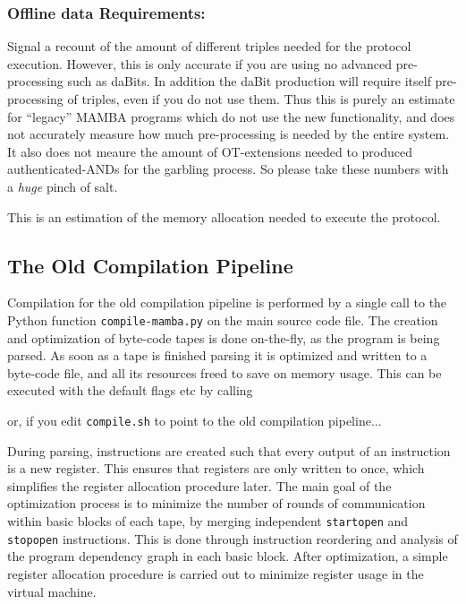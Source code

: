 \subsubsection{Offline data Requirements:}

Signal a recount of the amount of different triples needed for the protocol execution.
However, this is only accurate if you are using no advanced pre-processing such
as daBits. In addition the daBit production will require itself
pre-processing of triples, even if you do not use them. Thus this is purely an estimate
for ``legacy'' MAMBA programs which do not use the new functionality, and
does not accurately measure how much pre-processing is needed by the
entire system.
It also does not meaure the amount of OT-extensions needed to produced
authenticated-ANDs for the garbling process.
So please take these numbers with a {\em huge} pinch of salt.

This is an estimation of the memory allocation needed to execute the protocol.

\subsection{The Old Compilation Pipeline}
Compilation for the old compilation pipeline is performed by a single call to the
Python function \verb|compile-mamba.py| on the main source code file. The creation and optimization
of byte-code tapes is done on-the-fly, as the program is being parsed. As soon
as a tape is finished parsing it is optimized and written to a byte-code
file, and all its resources freed to save on memory usage.
This can be executed with the default flags etc by calling


\noindent or, if you edit \verb+compile.sh+ to point to the old compilation
pipeline...


During parsing, instructions are created such that every output of an
instruction is a new register. This ensures that registers are only written to
once, which simplifies the register allocation procedure later.
The main goal of the optimization process is to minimize the number of rounds
of communication within basic blocks of each tape, by merging independent
\verb|startopen| and \verb|stopopen| instructions. This is done through
instruction reordering and analysis of the program dependency graph in
each basic block. After optimization, a simple register allocation procedure
is carried out to minimize register usage in the virtual machine.

